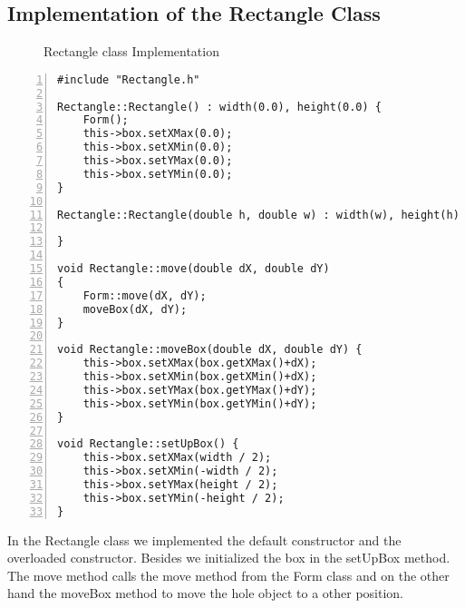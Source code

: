 \documentclass{article}
\begin{document}
\subsection{Implementation of the Rectangle Class}
\begin{figure}
\scriptsize{\caption{Rectangle class Implementation}}
\end{figure}
\begin{lstlisting}[basicstyle=\footnotesize\ttfamily, numbers=left, stepnumber=1, numberstyle = \normalsize]
#include "Rectangle.h"

Rectangle::Rectangle() : width(0.0), height(0.0) {
	Form();
	this->box.setXMax(0.0);
	this->box.setXMin(0.0);
	this->box.setYMax(0.0);
	this->box.setYMin(0.0);
}

Rectangle::Rectangle(double h, double w) : width(w), height(h) {

}

void Rectangle::move(double dX, double dY)
{
	Form::move(dX, dY);
	moveBox(dX, dY);
}

void Rectangle::moveBox(double dX, double dY) {
	this->box.setXMax(box.getXMax()+dX);
	this->box.setXMin(box.getXMin()+dX);
	this->box.setYMax(box.getYMax()+dY);
	this->box.setYMin(box.getYMin()+dY);
}

void Rectangle::setUpBox() {
	this->box.setXMax(width / 2);
	this->box.setXMin(-width / 2);
	this->box.setYMax(height / 2);
	this->box.setYMin(-height / 2);
}
\end{lstlisting}
\normalsize{In the Rectangle class we implemented the default constructor and the overloaded constructor. Besides we initialized the box in the setUpBox method. The move method calls the move method from the Form class and on the other hand the moveBox method to move the hole object to a other position.\newline
}
\newpage
\end{document}

